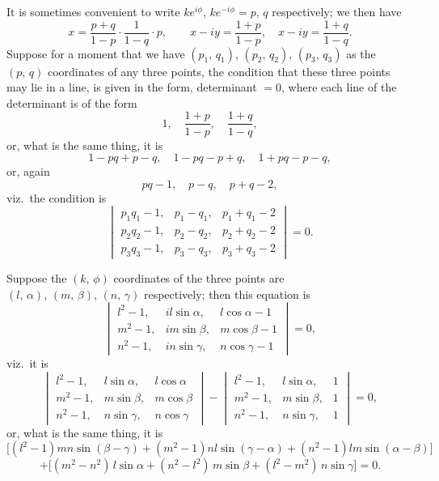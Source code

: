 \documentclass[11pt]{article}
\begin{document}
It is sometimes convenient to write $ke^{i\phi}$, $ke^{-i\phi} = p,\,q$ respectively; we then have
\[
   x = \frac{p+q}{1-p}\cdot\frac{1}{1-q}\cdot p,\qquad x - iy = \frac{1+p}{1-p},\quad x - iy = \frac{1+q}{1-q}.
\]
Suppose for a moment that we have $(p_1,\,q_1)$, $(p_2,\,q_2)$, $(p_3,\,q_3)$ as the $(p,\,q)$ coordinates
of any three points, the condition that these three points may lie in a line, is given
in the form, determinant $= 0$, where each line of the determinant is of the form
\[
   1,\quad \frac{1+p}{1-p},\quad \frac{1+q}{1-q},
\]
or, what is the same thing, it is
\[
   1 - pq + p - q,\quad 1 - pq - p + q,\quad 1 + pq - p - q,
\]
or, again
\[
   pq - 1,\quad p - q,\quad p + q - 2,
\]
viz.\ the condition is
\[
\begin{vmatrix}
p_1 q_1 - 1, & p_1 - q_1, & p_1 + q_1 - 2 \\
p_2 q_2 - 1, & p_2 - q_2, & p_2 + q_2 - 2 \\
p_3 q_3 - 1, & p_3 - q_3, & p_3 + q_3 - 2
\end{vmatrix} = 0.
\]

Suppose the $(k,\,\phi)$ coordinates of the three points are $(l,\,\alpha),\,(m,\,\beta),\,(n,\,\gamma)$ respectively;
then this equation is
\[
\begin{vmatrix}
l^2 - 1, & i l\sin\alpha, & l\cos\alpha - 1 \\
m^2 - 1, & i m\sin\beta,  & m\cos\beta - 1 \\
n^2 - 1, & i n\sin\gamma,  & n\cos\gamma - 1
\end{vmatrix} = 0,
\]
viz.\ it is
\[
\begin{vmatrix}
l^2 - 1, & l\sin\alpha, & l\cos\alpha \\
m^2 - 1, & m\sin\beta,  & m\cos\beta \\
n^2 - 1, & n\sin\gamma,  & n\cos\gamma
\end{vmatrix}
-
\begin{vmatrix}
l^2 - 1, & l\sin\alpha, & 1 \\
m^2 - 1, & m\sin\beta,  & 1 \\
n^2 - 1, & n\sin\gamma,  & 1
\end{vmatrix} = 0,
\]
or, what is the same thing, it is
\[
\bigl[(l^2 - 1) mn\sin(\beta - \gamma) + (m^2 - 1) nl\sin(\gamma - \alpha) + (n^2 - 1) lm\sin(\alpha - \beta)\bigr]
\]
\[
+ \bigl[(m^2 - n^2)\,l\sin\alpha + (n^2 - l^2)\,m\sin\beta + (l^2 - m^2)\,n\sin\gamma\bigr] = 0.
\]
\end{document}
